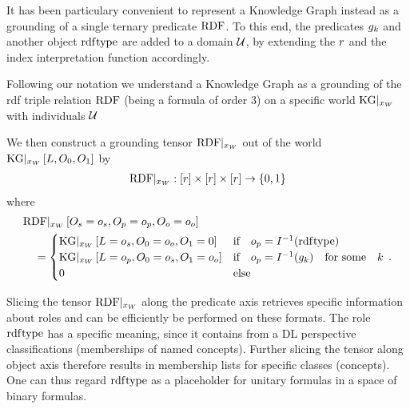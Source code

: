 \label{subsec:knowledgeGraphTernaryRep}

It has been particulary convenient to represent a Knowledge Graph instead as a grounding of a single ternary predicate $\mathrm{RDF}$.
To this end, the predicates $g_{k}$ and another object $\mathrm{rdf}\mathrm{type}$ are added to a domain $\mathcal{U}$, by extending the $r$ and the index interpretation function accordingly.


Following our notation we understand a Knowledge Graph as a grounding of the rdf triple relation $\mathrm{RDF}$ (being a formula of order 3) on a specific world $\mathrm{KG}|_{x_{W}}$ with individuals $\mathcal{U}$

We then construct a grounding tensor ${\mathrm{RDF}}|_{x_{W}}$ out of the world $\mathrm{KG}|_{x_{W}}\left[L,O_{0},O_{1}\right]$ by
\begin{align*}
    {\mathrm{RDF}}|_{x_{W}} : [r] \times [r] \times [r] \rightarrow \{0,1\}
\end{align*}
where
\begin{align*}
    &{\mathrm{RDF}}|_{x_{W}}\left[O_{s}=o_{s}, O_{p}=o_{p}, O_{o}=o_{o}\right] \\
    &\quad =
    \begin{cases}
        \mathrm{KG}|_{x_{W}}\left[L=o_{s},O_{0}=o_{o},O_{1}=0\right]
        & \text{if}\quad o_{p} = I^{-1}(\mathrm{rdf}\mathrm{type}) \\
        \mathrm{KG}|_{x_{W}}\left[L=o_{p},O_{0}=o_{s},O_{1}=o_{o}\right]
        & \text{if}\quad o_{p} = I^{-1}(g_{k}) \quad \text{for some} \quad k \\
        0  \quad & \text{else}
    \end{cases} \, .
\end{align*}


Slicing the tensor ${\mathrm{RDF}}|_{x_{W}}$ along the predicate axis retrieves specific information about roles and can be efficiently be performed on these formats.
The role $\mathrm{rdf}\mathrm{type}$ has a specific meaning, since it contains from a DL perspective classifications (memberships of named concepts).
Further slicing the tensor along object axis therefore results in membership lists for specific classes (concepts).
One can thus regard $\mathrm{rdf}\mathrm{type}$ as a placeholder for unitary formulas in a space of binary formulas.

